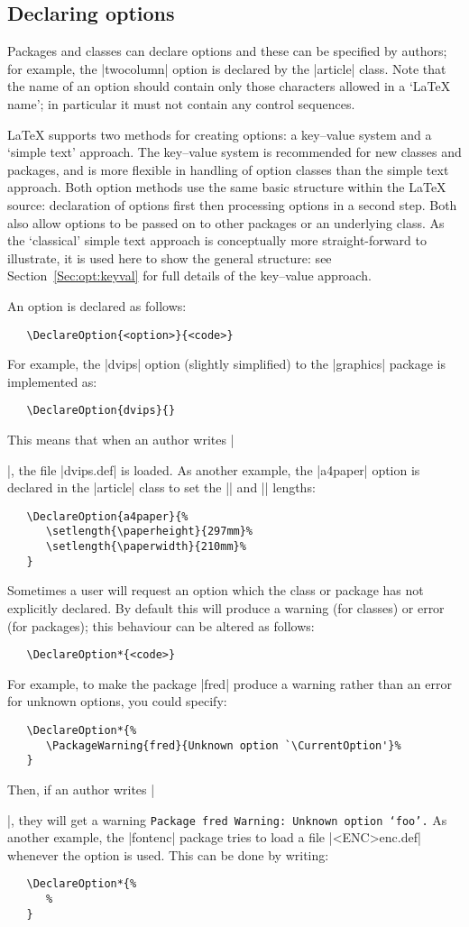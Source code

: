 \documentclass{ltxguide}
\begin{document}
\subsection{Declaring options}

Packages and classes can declare options and these can be specified by authors;
for example, the |twocolumn| option is declared by the |article| class. Note
that the name of an option should contain only those characters allowed in a
`\LaTeX{} name'; in particular it must not contain any control sequences.

\LaTeX{} supports two methods for creating options: a key--value system and a
`simple text' approach. The key--value system is recommended for new classes
and packages, and is more flexible in handling of option classes than the
simple text approach. Both option methods use the same basic structure within
the \LaTeX{} source: declaration of options first then processing options in a
second step. Both also allow options to be passed on to other packages or an
underlying class. As the `classical' simple text approach is conceptually more
straight-forward to illustrate, it is used here to show the general structure:
see Section~\ref{Sec:opt:keyval} for full details of the key--value approach.

An option is declared as follows:
\begin{verbatim}
   \DeclareOption{<option>}{<code>}
\end{verbatim}
For example, the |dvips| option (slightly simplified)
to the |graphics| package is implemented as:
\begin{verbatim}
   \DeclareOption{dvips}{}
\end{verbatim}
This means that when an author writes |\usepackage[dvips]{graphics}|, the file
|dvips.def| is loaded. As another example, the |a4paper| option is declared in
the |article| class to set the |\paperheight| and |\paperwidth| lengths:
\begin{verbatim}
   \DeclareOption{a4paper}{%
      \setlength{\paperheight}{297mm}%
      \setlength{\paperwidth}{210mm}%
   }
\end{verbatim}
Sometimes a user will request an option which the class or package has not
explicitly declared. By default this will produce a warning (for classes) or
error (for packages); this behaviour can be altered as follows:
\begin{verbatim}
   \DeclareOption*{<code>}
\end{verbatim}
For example, to make the package |fred| produce a warning rather than an error
for unknown options, you could specify:
\begin{verbatim}
   \DeclareOption*{%
      \PackageWarning{fred}{Unknown option `\CurrentOption'}%
   }
\end{verbatim}
Then, if an author writes |\usepackage[foo]{fred}|, they will get a warning
\texttt{Package fred Warning: Unknown option `foo'.} As another example, the
|fontenc| package tries to load a file |<ENC>enc.def| whenever the 
option is used. This can be done by writing:
\begin{verbatim}
   \DeclareOption*{%
      %
   }
\end{verbatim}
\end{document}
